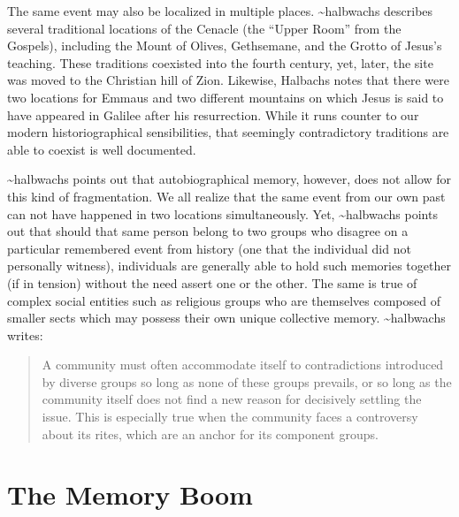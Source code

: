 The same event may also be localized in multiple places.
\textasciitilde{}halbwachs describes several traditional locations of
the Cenacle (the ``Upper Room'' from the Gospels), including the Mount
of Olives, Gethsemane, and the Grotto of Jesus's teaching. These
traditions coexisted into the fourth century, yet, later, the site was
moved to the Christian hill of Zion. Likewise, Halbachs notes that there
were two locations for Emmaus and two different mountains on which Jesus
is said to have appeared in Galilee after his resurrection. While it
runs counter to our modern historiographical sensibilities, that
seemingly contradictory traditions are able to coexist is well
documented.

\textasciitilde{}halbwachs points out that autobiographical memory,
however, does not allow for this kind of fragmentation. We all realize
that the same event from our own past can not have happened in two
locations simultaneously. Yet, \textasciitilde{}halbwachs points out
that should that same person belong to two groups who disagree on a
particular remembered event from history (one that the individual did
not personally witness), individuals are generally able to hold such
memories together (if in tension) without the need assert one or the
other. The same is true of complex social entities such as religious
groups who are themselves composed of smaller sects which may possess
their own unique collective memory. \textasciitilde{}halbwachs writes:

\begin{quote}
A community must often accommodate itself to contradictions introduced
by diverse groups so long as none of these groups prevails, or so long
as the community itself does not find a new reason for decisively
settling the issue. This is especially true when the community faces a
controversy about its rites, which are an anchor for its component
groups.\autocite[224]{halbwachs1992}
\end{quote}

\hypertarget{the-memory-boom}{%
\section{The Memory Boom}\label{the-memory-boom}}

